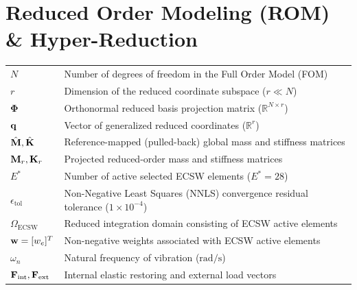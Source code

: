 \section*{Reduced Order Modeling (ROM) \& Hyper-Reduction}
\begin{tabular}{p{3.0cm} p{11.0cm}}
    $N$                         & Number of degrees of freedom in the Full Order Model (FOM) \\
    $r$                         & Dimension of the reduced coordinate subspace ($r \ll N$) \\
    $\boldsymbol{\Phi}$         & Orthonormal reduced basis projection matrix ($\mathbb{R}^{N \times r}$) \\
    $\mathbf{q}$                  & Vector of generalized reduced coordinates ($\mathbb{R}^r$) \\
    $\hat{\mathbf{M}}, \hat{\mathbf{K}}$ & Reference-mapped (pulled-back) global mass and stiffness matrices \\
    $\mathbf{M}_r, \mathbf{K}_r$      & Projected reduced-order mass and stiffness matrices \\
    $E^*$                       & Number of active selected ECSW elements ($E^* = 28$) \\
    $\epsilon_{\text{tol}}$      & Non-Negative Least Squares (NNLS) convergence residual tolerance ($1 \times 10^{-4}$) \\
    $\Omega_{\text{ECSW}}$       & Reduced integration domain consisting of ECSW active elements \\
    $\mathbf{w} = [w_e]^T$        & Non-negative weights associated with ECSW active elements \\
    $\omega_n$                  & Natural frequency of vibration ($\text{rad/s}$) \\
    $\mathbf{F}_{\text{int}}, \mathbf{F}_{\text{ext}}$ & Internal elastic restoring and external load vectors \\
\end{tabular}
